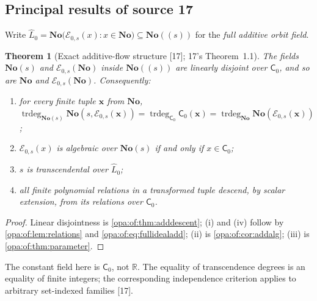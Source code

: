 \documentclass[11pt,oneside]{article}
\numberwithin{equation}{section}
\newtheorem{theorem}{Theorem}[section]
\theoremstyle{definition}
\theoremstyle{remark}
\newcommand{\No}{\mathbf{No}}
\newcommand{\R}{\mathbb R}
\newcommand{\EE}{\mathcal E}
\newcommand{\trdeg}{\operatorname{trdeg}}
\newcommand{\src}[1]{\textup{\textsf{\small[#1]}}}
\begin{document}
\subsection{Principal results of source 17}\label{opa:of:sub:results}

Write $\widehat L_0=\No\bigl(\EE_{0,s}(x):x\in\No\bigr)\subseteq\No((s))$ for the \emph{full additive orbit field}.

\begin{theorem}[Exact additive-flow structure \src{17}; 17's Theorem~1.1]\label{opa:of:thm:mainadd}
The fields $\No(s)$ and $\EE_{0,s}(\No)$ inside $\No((s))$ are linearly disjoint over $\mathsf C_0$, and so are $\No$ and
$\EE_{0,s}(\No)$. Consequently:
\begin{enumerate}[label=\textup{(\roman*)},itemsep=1pt]
\item for every finite tuple $\mathbf x$ from $\No$,
$\trdeg_{\No(s)}\No(s,\EE_{0,s}(\mathbf x))=\trdeg_{\mathsf C_0}\mathsf C_0(\mathbf x)=\trdeg_{\No}\No(\EE_{0,s}(\mathbf x))$;
\item $\EE_{0,s}(x)$ is algebraic over $\No(s)$ if and only if $x\in\mathsf C_0$;
\item $s$ is transcendental over $\widehat L_0$;
\item all finite polynomial relations in a transformed tuple descend, by scalar extension, from its relations over
$\mathsf C_0$.
\end{enumerate}
\end{theorem}
\begin{proof}
Linear disjointness is \cref{opa:of:thm:adddescent}; (i) and (iv) follow by \cref{opa:of:lem:relations} and
\eqref{opa:of:eq:fullidealadd}; (ii) is \cref{opa:of:cor:addalg}; (iii) is \cref{opa:of:thm:parameter}.
\end{proof}

The constant field here is $\mathsf C_0$, not $\R$. The equality of transcendence degrees is an equality of finite
integers; the corresponding independence criterion applies to arbitrary set-indexed families \src{17}.
\end{document}

